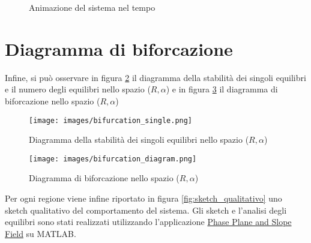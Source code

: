 \documentclass{article}
\begin{document}
\begin{figure}[ht]
    \centering
    \caption{Animazione del sistema nel tempo}
    \label{fig:animazione}
\end{figure}

\newpage

\section{Diagramma di biforcazione}

Infine, si può osservare in figura \ref{fig:diagramma_biforcazione_singolo} il diagramma della stabilità dei singoli equilibri e il numero degli equilibri nello spazio (\(R, \alpha\)) e in figura \ref{fig:diagramma_biforcazione} il diagramma di biforcazione nello spazio (\(R, \alpha\))

\begin{figure}
    \centering
    \texttt{[image: images/bifurcation\_single.png]}
    \caption{Diagramma della stabilità dei singoli equilibri nello spazio (\(R,\alpha\))}
    \label{fig:diagramma_biforcazione_singolo}
\end{figure}

\begin{figure}
    \centering
    \texttt{[image: images/bifurcation\_diagram.png]}
    \caption{Diagramma di biforcazione nello spazio (\(R, \alpha\))}
    \label{fig:diagramma_biforcazione}
\end{figure}

\newpage
Per ogni regione viene infine riportato in figura \ref{fig:sketch_qualitativo} uno sketch qualitativo del comportamento del sistema. Gli sketch e l'analisi degli equilibri sono stati realizzati utilizzando l'applicazione {\href{https://it.mathworks.com/matlabcentral/fileexchange/91705-phase-plane-and-slope-field-apps}{Phase Plane and Slope Field}} su MATLAB.
\end{document}
